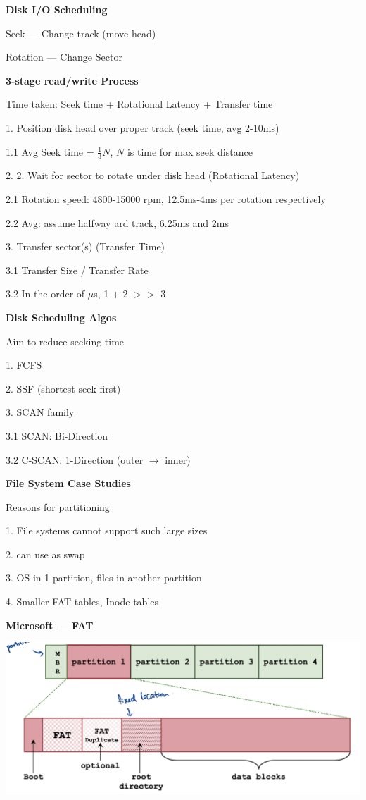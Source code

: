 \documentclass[10pt, a4paper]{article}
\newcommand{\blue}[1]{{\color{MidnightBlue}#1}}
\newcommand{\header}[1]{{\normalsize\textbf{#1}}}
\newcommand{\tab}[0]{\hspace*{2mm}}
\begin{document}
\begin{multicols*}{3}
		\textbf{Disk I/O Scheduling}

		\blue{Seek} --- Change track (move head)

		\blue{Rotation} --- Change Sector

		\textbf{3-stage read/write Process}

		\centerline{\blue{Time taken}: Seek time + Rotational Latency + Transfer time}

		1. Position disk head over proper track (seek time, avg 2-10ms)

		\tab{} 1.1 Avg Seek time = $\frac{1}{3} N$, $N$ is time for max seek distance

		2. 2. Wait for sector to rotate under disk head (Rotational Latency)

		\tab{} 2.1 Rotation speed: 4800-15000 rpm, 12.5ms-4ms per rotation respectively

		\tab{} 2.2 Avg: assume halfway ard track, 6.25ms and 2ms

		3. Transfer sector(s) (Transfer Time)

		\tab{} 3.1 Transfer Size / Transfer Rate

		\tab{} 3.2 In the order of $\mu$s, 1 + 2 $>>$ 3

		\textbf{Disk Scheduling Algos}

		Aim to reduce seeking time

		1. FCFS

		2. SSF (shortest seek first)

		3. SCAN family

		\tab{} 3.1 \blue{SCAN}: Bi-Direction 

		\tab{} 3.2 \blue{C-SCAN}: 1-Direction (outer $\rightarrow$ inner)

		\header{File System Case Studies}

		Reasons for partitioning

		1. File systems cannot support such large sizes

		2. can use as swap

		3. OS in 1 partition, files in another partition

		4. \blue{Smaller} FAT tables, Inode tables

		\textbf{Microsoft --- FAT}

		\includegraphics*[scale=0.2]{./assets/FatPartition}


\end{multicols*}
\end{document}

